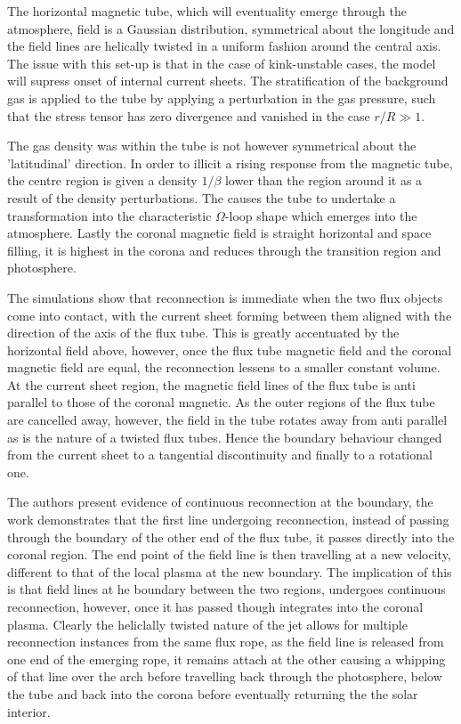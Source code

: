 The horizontal magnetic tube, which will eventuality emerge through the atmosphere, field is a Gaussian distribution, symmetrical about the longitude and the field lines are helically twisted in a uniform fashion around the central axis.
The issue with this set-up is that in the case of kink-unstable cases, the model will supress onset of internal current sheets. 
The stratification of the background gas is applied to the tube by applying a perturbation in the gas pressure, such that the stress tensor has zero divergence and vanished in the case $r/R \gg 1$.

The gas density was within the tube is not however symmetrical about the 'latitudinal' direction.
In order to illicit a rising response from the magnetic tube, the centre region is given a density $1/\beta$ lower than the region around it as a result of the density perturbations.
The causes the tube to undertake a transformation into the characteristic $\Omega$-loop shape which emerges into the atmosphere.
Lastly the coronal magnetic field is straight horizontal and space filling, it is highest in the corona and reduces through the transition region and photosphere.

The simulations show that reconnection is immediate when the two flux objects come into contact, with the current sheet forming between them aligned with the direction of the axis of the flux tube.
This is greatly accentuated by the horizontal field above, however, once the flux tube magnetic field and the coronal magnetic field are equal, the reconnection lessens to a smaller constant volume. 
At the current sheet region, the magnetic field lines of the flux tube is anti parallel to those of the coronal magnetic.
As the outer regions of the flux tube are cancelled away, however, the field in the tube rotates away from anti parallel as is the nature of a twisted flux tubes.
Hence the boundary behaviour changed from the current sheet to a tangential discontinuity and finally to a rotational one.

The authors present evidence of continuous reconnection at the boundary, the work demonstrates that the first line undergoing reconnection, instead of passing through the boundary of the other end of the flux tube, it passes directly into the coronal region.
The end point of the field line is then travelling at a new velocity, different to that of the local plasma at the new boundary.
The implication of this is that field lines at he boundary between the two regions, undergoes continuous reconnection, however, once it has passed though integrates into the coronal plasma.
Clearly the heliclally twisted nature of the jet allows for multiple reconnection instances from the same flux rope, as the field line is released from one end of the emerging rope, it remains attach at the other causing a whipping of that line over the arch before travelling back through the photosphere, below the tube and back into the corona before eventually returning the the solar interior. 

